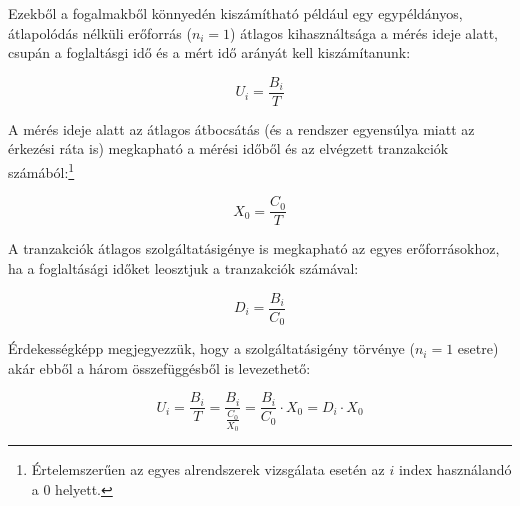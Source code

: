 Ezekből a fogalmakből könnyedén kiszámítható például egy egypéldányos, átlapolódás nélküli erőforrás ($n_i = 1$) átlagos kihasználtsága a mérés ideje alatt, csupán a foglaltásgi idő és a mért idő arányát kell kiszámítanunk:

$$U_i = \frac{B_i}{T}$$

A mérés ideje alatt az átlagos átbocsátás (és a rendszer egyensúlya miatt az érkezési ráta is) megkapható a mérési időből és az elvégzett tranzakciók számából:\footnote{Értelemszerűen az egyes alrendszerek vizsgálata esetén az $i$ index használandó a 0 helyett.}

$$X_0 = \frac{C_0}{T}$$

A tranzakciók átlagos szolgáltatásigénye is megkapható az egyes erőforrásokhoz, ha a foglaltásági időket leosztjuk a tranzakciók számával:

$$D_i = \frac{B_i}{C_0}$$

Érdekességképp megjegyezzük, hogy a szolgáltatásigény törvénye ($n_i = 1$ esetre) akár ebből a három összefüggésből is levezethető:

$$U_i = \frac{B_i}{T} = \frac{B_i}{\frac{C_0}{X_0}} = \frac{B_i}{C_0} \cdot X_0 = D_i \cdot X_0$$
